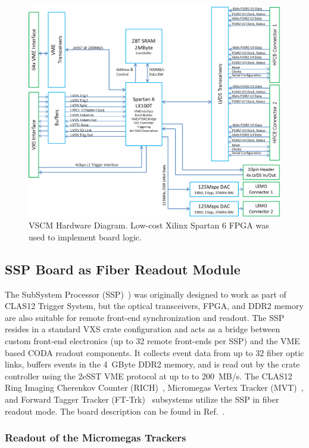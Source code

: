 \begin{figure}[hbt]
	\centering
	\includegraphics[width=1.0\columnwidth,keepaspectratio]{img/vscm_blockdiagram.png}
	\caption{VSCM Hardware Diagram. Low-cost Xilinx Spartan 6 FPGA was used to implement board logic.}
	\label{fig:vscm_blockdiagram}
\end{figure}

\subsection{SSP Board as Fiber Readout Module}

The SubSystem Processor (SSP)~\cite{ssp-ref}) was originally designed to work as part of CLAS12 Trigger System,
but the optical transceivers, FPGA, and DDR2 memory are also suitable for remote front-end synchronization and readout.
The SSP resides in a standard VXS crate configuration and acts as a bridge between custom front-end electronics (up to
32 remote front-ends per SSP) and the VME based CODA readout components. It collects event data from up to 32 fiber
optic links, buffers events in the 4~GByte DDR2 memory, and is read out by the crate controller using the 2eSST VME
protocol at up to to 200~MB/s. The CLAS12 Ring Imaging Cherenkov Counter (RICH)~\cite{rich-ref}, Micromegas Vertex
Tracker (MVT)~\cite{mvt-ref}, and Forward Tagger Tracker (FT-Trk)~\cite{ft-ref} subsystems utilize the SSP in fiber
readout mode. The board description can be found in Ref.~\cite{trig-ref}.

\subsubsection{Readout of the Micromegas Trackers}

